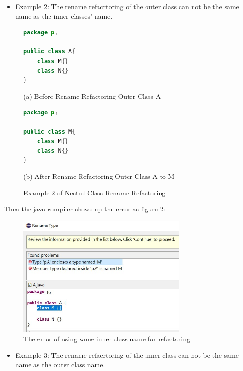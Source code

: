 \begin{itemize}
\item Example 2: The rename refacrtoring of the outer class can not be the same name as the inner classes' name.
\end{itemize}

\begin{figure}[th]
\centering
\begin{minipage}[t]{0.45\linewidth}
\begin{lstlisting}[language=java, basicstyle=\scriptsize\ttfamily,frame=single]
package p;

public class A{	
    class M{}
    class N{}
} 
\end{lstlisting}
\tiny{(a) Before Rename Refactoring Outer Class A}
\end{minipage}
\hfill
\begin{minipage}[t]{0.45\linewidth}
\begin{lstlisting}[language=java, basicstyle=\scriptsize\ttfamily,frame=single]
package p;

public class M{	
    class M{}
    class N{}
} 
\end{lstlisting}
\tiny{(b) After Rename Refactoring Outer Class A to M}
\end{minipage}
\caption{Example 2 of Nested Class Rename Refactoring}
\label{fig:nestedclass2}
\end{figure}

Then the java compiler shows up the error as figure \ref{fig:NC2}:

\begin{figure}[H]
\centerline{\includegraphics[width=85mm,scale=0.5]{NC2.jpg}}
\caption{The error of using same inner class name for refactoring}
\label{fig:NC2}
\end{figure}

\begin{itemize}
\item Example 3: The rename refacrtoring of the inner class can not be the same name as the  outer class name.
\end{itemize}

